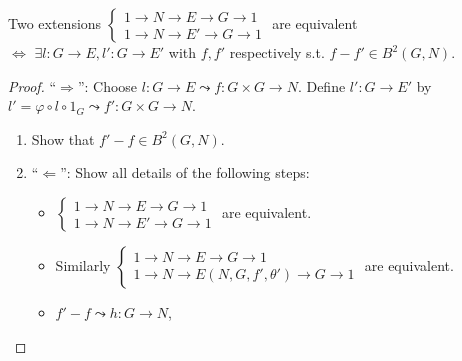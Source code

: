 \begin{theorem}
  Two extensions $\begin{cases}
    1\to N\to E\to G\to 1 \\
    1\to N\to E'\to G\to 1
  \end{cases}$ are equivalent \\ $\iff$
  $\exists l: G\to E, l': G\to E'$ with $f, f'$ respectively s.t.
  $f - f' \in B^2(G, N)$.

  \begin{proof}
    ``$\Rightarrow$'': Choose $l: G\to E \leadsto f: G\times G \to N$.
    Define $l': G\to E'$ by $l' = \varphi \circ l \circ 1_G \leadsto
    f': G\times G \to N$.
    \begin{exercise} \mbox{}
      \begin{enumerate}[(1)]
        \item Show that $f' - f \in B^2(G, N)$.
        \item ``$\Leftarrow$'': Show all details of the following steps:
          \begin{itemize}
            \item $\begin{cases}
                1\to N\to E\to G\to 1 \\
                1\to N\to E'\to G\to 1
              \end{cases}$ are equivalent.
            \item Similarly $\begin{cases}
                1\to N\to E\to G\to 1 \\
                1\to N\to E(N, G, f', \theta')\to G\to 1
              \end{cases}$ are equivalent.
            \item $f'-f \leadsto h:G\to N$,
          \end{itemize}
          \qedhere
      \end{enumerate}
    \end{exercise}
  \end{proof}
\end{theorem}


